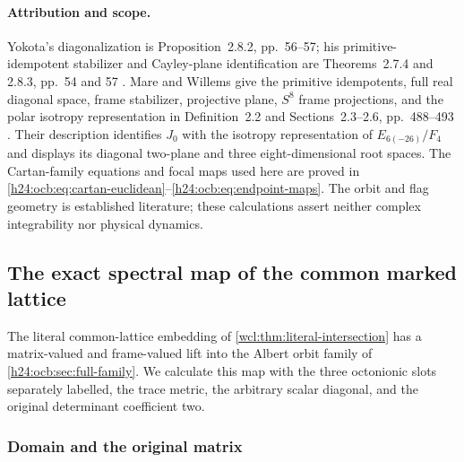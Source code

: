 \paragraph{Attribution and scope.}
Yokota's diagonalization is Proposition~2.8.2, pp.~56--57;
his primitive-idempotent stabilizer and Cayley-plane identification
are Theorems~2.7.4 and 2.8.3, pp.~54 and 57
\cite{h24:Yokota2009}. Mare and Willems give the primitive idempotents,
full real diagonal space, frame stabilizer, projective plane,
$S^8$ frame projections, and the polar isotropy representation
in Definition~2.2 and Sections~2.3--2.6, pp.~488--493
\cite{h24:MareWillems2013}. Their description identifies $J_0$ with
the isotropy representation of $E_{6(-26)}/F_4$ and displays its
diagonal two-plane and three eight-dimensional root spaces. The
Cartan-family equations and focal maps used here are proved in
\eqref{h24:ocb:eq:cartan-euclidean}--\eqref{h24:ocb:eq:endpoint-maps}.
The orbit and flag geometry is established literature; these
calculations assert neither complex integrability nor physical
dynamics.


\subsection{The exact spectral map of the common marked lattice}
\label{h24:ncs:sec:spectral-bridge}

The literal common-lattice embedding of
\cref{wcl:thm:literal-intersection} has a matrix-valued and
frame-valued lift into the Albert orbit family of
\cref{h24:ocb:sec:full-family}. We calculate this map with the three
octonionic slots separately labelled, the trace metric, the arbitrary
scalar diagonal, and the original determinant coefficient two.

\subsubsection{Domain and the original matrix}
\label{h24:ncs:sec:domain}

